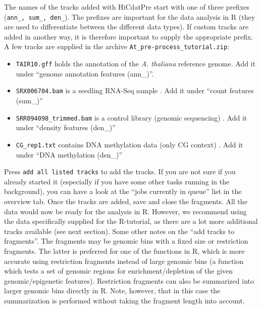 \documentclass[a4paper,10pt]{article}
\begin{document}
The names of the tracks added with HiCdatPre start with one of three prefixes (\texttt{ann\_, sum\_, den\_}). The prefixes are important for the data analysis in R (they are used to differentiate between the different data types). If custom tracks are added in another way, it is therefore important to supply the appropriate prefix.
\newline
\newline
A few tracks are supplied in the archive \texttt{At\_pre-process\_tutorial.zip}: 
\begin{itemize}
 \item \texttt{TAIR10.gff} holds the annotation of the \textit{A. thaliana} reference genome. Add it under ``genome annotation features (ann\_)''.
 \item \texttt{SRX006704.bam} is a seedling RNA-Seq sample \cite{2010_Filichkin}. Add it under ``count features (sum\_)''
 \item \texttt{SRR094098\_trimmed.bam} is a control library (genomic sequencing) \cite{2010_Jacob}. Add it under ``density features (den\_)''
 \item \texttt{CG\_rep1.txt} contains DNA methylation data (only CG context) \cite{2013_Stroud}. Add it under ``DNA methylation (den\_)''
\end{itemize}
Press \texttt{add all listed tracks} to add the tracks. If you are not sure if you already started it (especially if you have some other tasks running in the background), you can have a look at the ``jobs currently in queue'' list in the overview tab. Once the tracks are added, save and close the fragments. All the data would now be ready for the analysis in R. However, we recommend using the data specifically supplied for the R-tutorial, as there are a lot more additional tracks available (see next section).
\newline
\newline
Some other notes on the ``add tracks to fragments''. The fragments may be genomic bins with a fixed size or restriction fragments. The latter is preferred for one of the functions in R, which is more accurate using restriction fragments instead of large genomic bins (a function which tests a set of genomic regions for enrichment/depletion of the given genomic/epigenetic features). Restriction fragments can also be summarized into larger genomic bins directly in R. Note, however, that in this case the summarization is performed without taking the fragment length into account. 
\newline
\newline
\end{document}
